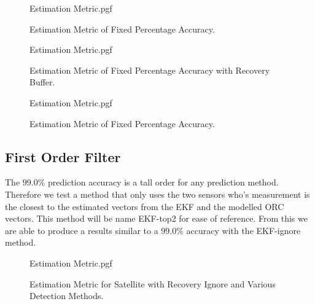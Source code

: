 \documentclass[letterpaper, 10 pt, conference]{ieeeconf}  %
\begin{document}
\begin{figure}[!htb]
	\begin{center}
		{Estimation Metric.pgf}
	\end{center}
	\caption[Estimation Metric of $90.0\%$ Accuracy]{Estimation Metric of Fixed Percentage Accuracy.}
	\label{fig:Estimation Accuracy EKF-ignore 90 perfectnofailureprediction}
\end{figure}

\begin{figure}[!htb]
	\begin{center}
		{Estimation Metric.pgf}
	\end{center}
	\caption[Estimation Metric of $90.0\%$ Accuracy with Recovery Buffer]{Estimation Metric of Fixed Percentage Accuracy with Recovery Buffer.}
	\label{fig:Estimation Accuracy EKF-ignore 90 with Recovery Buffer}
\end{figure}

\begin{figure}[!htb]
	\begin{center}
		{Estimation Metric.pgf}
	\end{center}
	\caption[Estimation Metric of $90.0\%$ Accuracy]{Estimation Metric of Fixed Percentage Accuracy.}
	\label{fig:Estimation Accuracy EKF-ignore 90 perfectnofailureprediction with Recovery Buffer}
\end{figure}


\subsection{First Order Filter}
The $99.0\%$ prediction accuracy is a tall order for any prediction method. Therefore we test a method that only uses the two sensors who's measurement is the closest to the estimated vectors from the EKF and the modelled ORC vectors. This method will be name EKF-top2 for ease of reference. From this we are able to produce a results similar to a $99.0\%$ accuracy with the EKF-ignore method.

\begin{figure}[!htb]
	\begin{center}
		{Estimation Metric.pgf}
	\end{center}
	\caption[Estimation Metric for Satellite with Recovery Ignore and Various detection Methods]{Estimation Metric for Satellite with Recovery Ignore and Various Detection Methods.}
	\label{fig:Estimation Accuracy EKF-top2 summary}
\end{figure}
\end{document}
